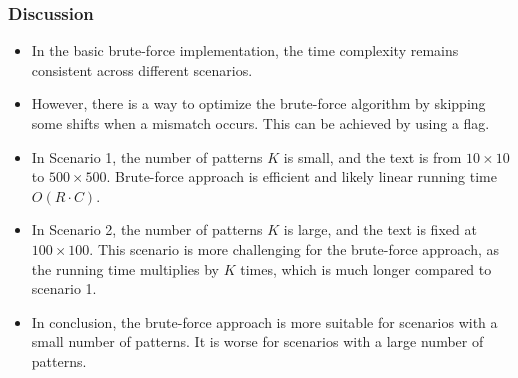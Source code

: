     \subsubsection{Discussion}
    \begin{itemize}
        \item In the basic brute-force implementation, the time complexity remains consistent across different scenarios.
        \item However, there is a way to optimize the brute-force algorithm by skipping some shifts when a mismatch occurs. This can be achieved by using a flag.
        \item In Scenario 1, the number of patterns $K$ is small, and the text is from $10 \times 10$ to $500 \times500$.
        Brute-force approach is efficient and likely linear running time $O(R \cdot C)$.
        \item In Scenario 2, the number of patterns $K$ is large, and the text is fixed at $100 \times 100$.
        This scenario is more challenging for the brute-force approach, as the running time multiplies by $K$ times,
        which is much longer compared to scenario 1.
        \item In conclusion, the brute-force approach is more suitable for scenarios with a small number of patterns.
        It is worse for scenarios with a large number of patterns.
    \end{itemize}
        